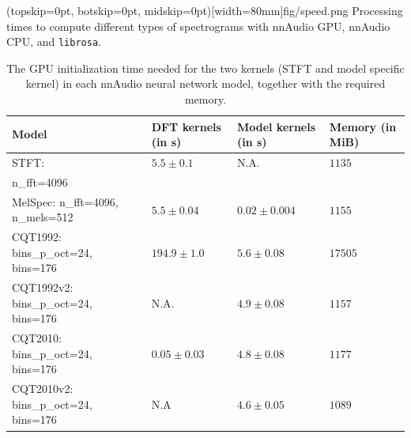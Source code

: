 \documentclass{ieeeaccess}
\newcommand{\nbh}[1]{\texttt{#1}}
\begin{document}
\Figure(topskip=0pt, botskip=0pt, midskip=0pt)[width=80mm]{fig/speed.png}
{Processing times to compute different types of spectrograms with nnAudio GPU, nnAudio CPU, and \nbh{librosa}. \label{fig:speed}}




\begin{table}[h!]
\caption{The GPU initialization time needed for the two kernels (STFT and model specific kernel) in each nnAudio neural network model, together with the required memory. }
\centering
\label{tab: mem}
\setlength{\tabcolsep}{5pt}
\begin{tabular}{p{60pt} p{45pt} p{45pt} p{35pt}}
\toprule
Model& 
DFT kernels (in s)& 
Model kernels (in s) & Memory (in MiB)\\\midrule
STFT:   & $5.5\pm 0.1$   & N.A. & $1135$\\
n\_fft=4096 & & & \\\hdashline
MelSpec:  n\_fft=4096, n\_mels=512 & $5.5\pm 0.04$  & $0.02\pm 0.004$ & $1155$\\\hdashline
CQT1992: bins\_p\_oct=24, bins=176  & $194.9\pm 1.0$ & $5.6 \pm 0.08$ & $17505$\\\hdashline
CQT1992v2: bins\_p\_oct=24, bins=176& N.A.           & $4.9 \pm 0.08$ & $1157$\\\hdashline
CQT2010: bins\_p\_oct=24, bins=176  & $0.05\pm 0.03$ & $4.8\pm 0.08$ & $1177$\\\hdashline
CQT2010v2: bins\_p\_oct=24, bins=176& N.A            & $4.6\pm 0.05$ & $1089$\\
\bottomrule
\end{tabular}
\label{tab: GPU_util}
\end{table}
\end{document}

